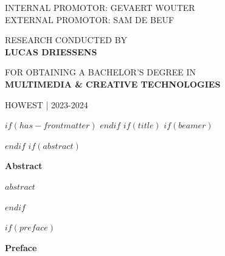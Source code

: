 \documentclass[12pt]{article}
\begin{document}
\begin{titlepage}
\begin{adjustwidth}{1.5cm}{1.5cm}
    \vspace{2em}

    \noindent\MakeUppercase{\large{Internal promotor: Gevaert Wouter}} \\
    \MakeUppercase{\large{External promotor: Sam De beuf}}

    \vspace{2em}

    \noindent\MakeUppercase{\large{Research conducted by}} \\
    \MakeUppercase{\Large\textbf{Lucas Driessens}}

    \vspace{2em}

    \noindent\MakeUppercase{\large{for obtaining a bachelor's degree in}} \\
    \MakeUppercase{\Large\textbf{Multimedia \& Creative Technologies}}

    \vspace{1em}

    \noindent\MakeUppercase{\large{Howest | 2023-2024}}
    \end{adjustwidth}
    \restoregeometry
    \normalfont
\end{titlepage}

\renewcommand{\familydefault}{\rmdefault}
\fontsize{12pt}{14pt}\selectfont


$if(has-frontmatter)$
\frontmatter
$endif$
$if(title)$
$if(beamer)$
\frame{\titlepage}


{}

$endif$
$if(abstract)$
\begin{center}
 {\LARGE \textbf{\textsf{Abstract}}}
\end{center}

\begin{justify}
$abstract$
\end{justify}
\pagebreak
$endif$

$if(preface)$
\begin{center}
 {\LARGE \textbf{\textsf{Preface}}}
\end{center}
\end{document}
